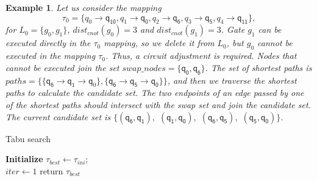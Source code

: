 \documentclass[journal]{IEEEtran}
\newtheorem{example}{Example}[section]
\begin{document}
\begin{example}
	Let us consider the mapping $$\tau_{0}=\{\textit{q}_\textit{0}\rightarrow  \textsf{q}_{\textsf{10}},\textit{q}_\textit{1}\rightarrow \textsf{q}_{\textsf{0}},
\textit{q}_\textit{2}\rightarrow  \textsf{q}_{\textsf{6}},\textit{q}_\textit{3}\rightarrow  \textsf{q}_{\textsf{5}},\textit{q}_\textit{4}\rightarrow  \textsf{q}_{\textsf{11}}\} , $$ 
for $L_{0}=\{g_{0},g_{1}\}$, $dist_{cnot}(g_{0})=3$ and $dist_{cnot}(g_{1})=3$. 
Gate $g_{1}$ can be executed directly in the $\tau_{0}$ mapping, so we delete it from $L_{0}$,
but $g_{0}$ cannot be executed in the mapping $\tau_{0}$.
Thus, a circuit adjustment is required. 
Nodes that cannot be executed join the set $swap\_nodes=\{\textsf{q}_{\textsf{0}},\textsf{q}_\textsf{6}\}$.
The set of shortest paths is $paths=\{\{\textsf{q}_{\textsf{6}}\rightarrow \textsf{q}_{\textsf{1}} \rightarrow \textsf{q}_{0} \},\{\textsf{q}_\textsf{6}\rightarrow \textsf{q}_\textsf{5} \rightarrow \textsf{q}_\textsf{0} \}\}$, 
and then we traverse the shortest paths to calculate the  candidate set.
The two endpoints of an edge passed by one of the shortest paths should intersect with the swap set and join the candidate set.
The current candidate set is $\{(\textsf{q}_\textsf{6},\textsf{q}_\textsf{1}),$ $(\textsf{q}_\textsf{1},\textsf{q}_\textsf{0}),$ $(\textsf{q}_\textsf{6},\textsf{q}_\textsf{5}),$ $(\textsf{q}_\textsf{5},\textsf{q}_\textsf{0}) \}$.
\end{example}

	\begin{algorithm}[htbp]
			\caption{Tabu search }  
			\LinesNumbered  
			\textbf{Initialize}
				$\tau_{best}  \leftarrow \tau_{ini}$; \\
				$iter \leftarrow 1$  
      return $\tau_{best}$
      
		\label{algorithm_Tabu}
	\end{algorithm}
        
\end{document}
